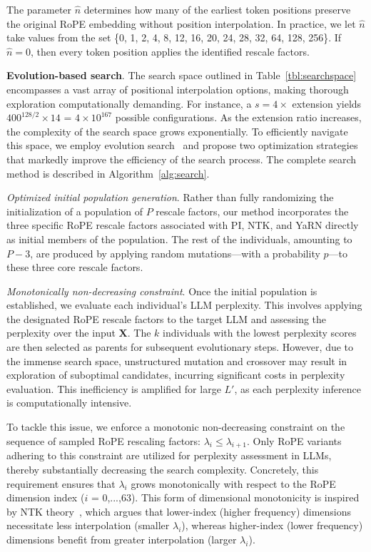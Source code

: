 The parameter $\hat{n}$ determines how many of the earliest token positions preserve the original RoPE embedding without position interpolation. In practice, we let $\hat{n}$ take values from the set \{0, 1, 2, 4, 8, 12, 16, 20, 24, 28, 32, 64, 128, 256\}. If $\hat{n}=0$, then every token position applies the identified rescale factors.

\textbf{Evolution-based search}. The search space outlined in Table~\ref{tbl:searchspace} encompasses a vast array of positional interpolation options, making thorough exploration computationally demanding. For instance, a $s=4\times$ extension yields $400^{128/2}\times14$ = $4\times10^{167}$ possible configurations. As the extension ratio increases, the complexity of the search space grows exponentially. To efficiently navigate this space, we employ evolution search~\cite{guo2020single} and propose two optimization strategies that markedly improve the efficiency of the search process. The complete search method is described in Algorithm~\ref{alg:search}.

\textit{Optimized initial population generation}. Rather than fully randomizing the initialization of a population of $P$ rescale factors, our method incorporates the three specific RoPE rescale factors associated with PI, NTK, and YaRN directly as initial members of the population. The rest of the individuals, amounting to $P-3$, are produced by applying random mutations—with a probability $p$—to these three core rescale factors.

\textit{Monotonically non-decreasing constraint}. Once the initial population is established, we evaluate each individual’s LLM perplexity. This involves applying the designated RoPE rescale factors to the target LLM and assessing the perplexity over the input $\mathbf{X}$. The $k$ individuals with the lowest perplexity scores are then selected as parents for subsequent evolutionary steps. However, due to the immense search space, unstructured mutation and crossover may result in exploration of suboptimal candidates, incurring significant costs in perplexity evaluation. This inefficiency is amplified for large $L'$, as each perplexity inference is computationally intensive.

To tackle this issue, we enforce a monotonic non-decreasing constraint on the sequence of sampled RoPE rescaling factors: $\lambda_i\le \lambda_{i+1}$. Only RoPE variants adhering to this constraint are utilized for perplexity assessment in LLMs, thereby substantially decreasing the search complexity. Concretely, this requirement ensures that $\lambda_i$ grows monotonically with respect to the RoPE dimension index ($i$ = 0,...,63). This form of dimensional monotonicity is inspired by NTK theory~\cite{jacot2018neural,tancik2020fourier,ntk}, which argues that lower-index (higher frequency) dimensions necessitate less interpolation (smaller $\lambda_i$), whereas higher-index (lower frequency) dimensions benefit from greater interpolation (larger $\lambda_i$).

